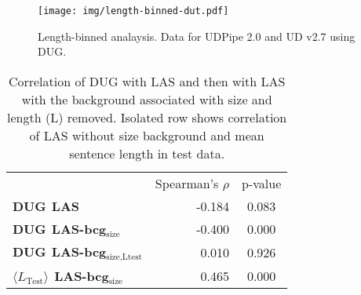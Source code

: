 \documentclass[11pt,a4paper]{article}
\begin{document}
\begin{figure*}[t]
    \centering
    \texttt{[image: img/length-binned-dut.pdf]}
    \caption{Length-binned analaysis. Data for UDPipe 2.0 and UD v2.7 using DUG.}
    \label{fig:dug-binned}
\end{figure*}



\begin{table}[bh!]
    \centering
    \small
    \begin{tabular}{lrc}
    \toprule
    & \multicolumn{1}{c}{Spearman's $\rho$} & \multicolumn{1}{c}{p-value} \\
    \textbf{DUG}$\:\:$\textbf{LAS} & -0.184 & 0.083 \\
    \textbf{DUG}$\:\:$\textbf{LAS-bcg$_{\textrm{size}}$} &  -0.400 & 0.000 \\
    \textbf{DUG}$\:\:$\textbf{LAS-bcg$_{\textrm{size,Ltest}}$} & 0.010 & 0.926 \\\midrule
    $\langle L_{\textrm{Test}}\rangle\:\:$\textbf{LAS-bcg$_{\textrm{size}}$} &  0.465 & 0.000 \\
    \bottomrule
    \end{tabular}
    \caption{Correlation of DUG with LAS and then with LAS with the background associated with size and length (L) removed. Isolated row shows correlation of LAS without size background and mean sentence length in test data.}
    \label{tab:noise_correlations}
\end{table}









%
%
\end{document}
